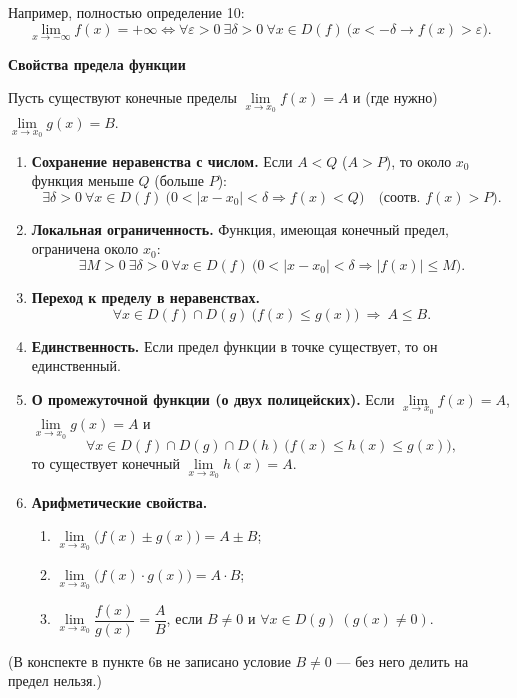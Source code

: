 \documentclass[a4paper,11pt]{article}
\newcommand{\eps}{\varepsilon}
\newcommand{\podr}[1]{\par\needspace{8\baselineskip}\medskip
  {\large\bfseries\textcolor{oprc!80!black}{#1}}\par\nopagebreak\smallskip}
\begin{document}
Например, полностью определение 10:
\[
  \lim_{x \to -\infty} f(x) = +\infty \Leftrightarrow \forall \eps > 0\ \exists \delta > 0\ \forall x \in D(f)\ \bigl(x < -\delta \to f(x) > \eps\bigr).
\]

\podr{Свойства предела функции}

Пусть существуют конечные пределы $\lim\limits_{x \to x_0} f(x) = A$ и (где нужно) $\lim\limits_{x \to x_0} g(x) = B$.

\begin{enumerate}[leftmargin=*]
  \item \textbf{Сохранение неравенства с числом.} Если $A < Q$ ($A > P$), то около $x_0$ функция меньше $Q$ (больше $P$):
    \[
      \exists \delta > 0\ \forall x \in D(f)\ \bigl( 0 < |x - x_0| < \delta \Rightarrow f(x) < Q \bigr)
      \quad \bigl(\text{соотв. } f(x) > P\bigr).
    \]
  \item \textbf{Локальная ограниченность.} Функция, имеющая конечный предел, ограничена около $x_0$:
    \[
      \exists M > 0\ \exists \delta > 0\ \forall x \in D(f)\ \bigl( 0 < |x - x_0| < \delta \Rightarrow |f(x)| \le M \bigr).
    \]
  \item \textbf{Переход к пределу в неравенствах.}
    \[
      \forall x \in D(f) \cap D(g)\ \bigl( f(x) \le g(x) \bigr) \ \Longrightarrow\ A \le B.
    \]
  \item \textbf{Единственность.} Если предел функции в точке существует, то он единственный.
  \item \textbf{О промежуточной функции (о двух полицейских).} Если $\lim\limits_{x \to x_0} f(x) = A$, $\lim\limits_{x \to x_0} g(x) = A$ и
    \[
      \forall x \in D(f) \cap D(g) \cap D(h)\ \bigl( f(x) \le h(x) \le g(x) \bigr),
    \]
    то существует конечный $\lim\limits_{x \to x_0} h(x) = A$.
  \item \textbf{Арифметические свойства.}
    \begin{enumerate}
      \item $\lim\limits_{x \to x_0} \bigl( f(x) \pm g(x) \bigr) = A \pm B$;
      \item $\lim\limits_{x \to x_0} \bigl( f(x) \cdot g(x) \bigr) = A \cdot B$;
      \item $\lim\limits_{x \to x_0} \dfrac{f(x)}{g(x)} = \dfrac{A}{B}$, если $B \ne 0$ и $\forall x \in D(g)\ (g(x) \ne 0)$.
    \end{enumerate}
\end{enumerate}
{\small\textcolor{zamc}{(В конспекте в пункте 6в не записано условие $B \ne 0$ --- без него делить на предел нельзя.)}}
\end{document}
